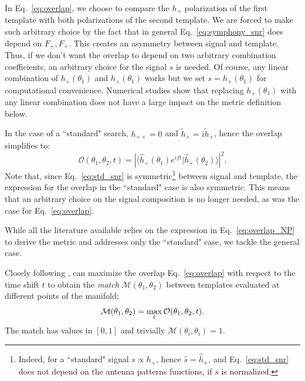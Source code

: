 \documentclass[twocolumn,showpacs,preprintnumbers,nofootinbib,prd,
superscriptaddress,10pt]{revtex4-2}
\newcommand{\scalar}[2]{\langle #1|#2 \rangle}
\begin{document}
In Eq.~\eqref{eq:overlap}, we choose to compare the $h_+$ polarization of the first template with both polarizations of the second template. We are forced to make such arbitrary choice by the fact that in general Eq.~\eqref{eq:symphony_snr} does depend on $F_+, F_\times$.
This creates an asymmetry between signal and template.
Thus, if we don't want the overlap to depend on two arbitrary combination coefficients, an arbitrary choice for the signal $s$ is needed.
Of course, any linear combination of $h_+(\theta_1)$ and $h_\times(\theta_1)$ works but we set $s = h_+(\theta_1)$ for computational convenience. Numerical studies show that replacing $h_+(\theta_1)$ with any linear combination does not have a large impact on the metric definition below.

In the case of a ``standard" search, $h_{+\times} = 0$ and ${\tilde{h}_\times = i \tilde{h}_+}$, hence the overlap simplifies to:
\begin{equation}\label{eq:overlap_NP}
\mathcal{O}(\theta_1,\theta_2, t) = \left|\scalar{\hat{h}_+(\theta_1)e^{i ft}}{\hat{h}_+(\theta_2)} \right|^2.
\end{equation}
Note that, since Eq.~\eqref{eq:std_snr} is symmetric\footnote{Indeed, for a ``standard" signal $s \propto h_+$, hence $\hat{s} = \hat{h}_+$, and Eq.~\eqref{eq:std_snr} does not depend on the antenna patterns functions, if $s$ is normalized.} between signal and template, the expression for the overlap in the ``standard" case is also symmetric. This means that an arbitrary choice on the signal composition is no longer needed, as was the case for Eq.~\eqref{eq:overlap}.

While all the literature available \cite{owen_metric, Messenger:2008ta, Prix:2007ks, Brown:2012qf, Roy:2017oul, Coogan:2022qxs, Hanna:2022zpk} relies on the expression in Eq.~\eqref{eq:overlap_NP} to derive the metric and addresses only the ``standard" case, we tackle the general case.

Closely following \cite{owen_metric}, can maximize the overlap Eq.~\eqref{eq:overlap} with respect to the time shift $t$ to obtain the {\it match} $\mathcal{M}(\theta_1,\theta_2)$ between templates evaluated at different points of the manifold:
\begin{equation}\label{eq:match}
	\mathcal{M}(\theta_1,\theta_2) = \max_t \mathcal{O}(\theta_1,\theta_2, t). \\
\end{equation}
%
The match has values in $[0,1]$ and trivially $\mathcal{M}(\theta_i,\theta_i) = 1$.
\end{document}
